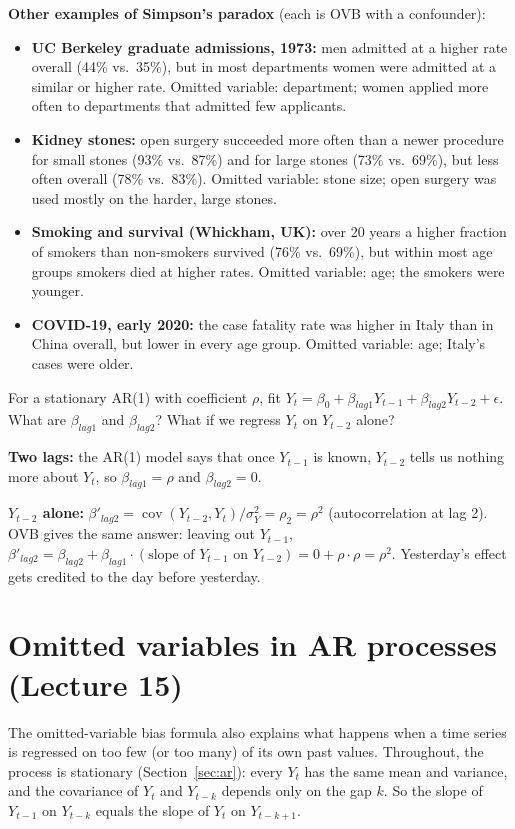 \documentclass[11pt]{article}
\newcommand{\Cov}{\operatorname{cov}}
\begin{document}
\textbf{Other examples of Simpson's paradox} (each is OVB with a confounder):
\begin{itemize}[leftmargin=*,itemsep=2pt]
\item \textbf{UC Berkeley graduate admissions, 1973:} men admitted at a higher rate overall (44\% vs.\ 35\%), but in most departments women were
admitted at a similar or higher rate. Omitted variable: department; women applied more often to departments that admitted few applicants.
\item \textbf{Kidney stones:} open surgery succeeded more often than a newer procedure for small stones (93\% vs.\ 87\%) and for large stones
(73\% vs.\ 69\%), but less often overall (78\% vs.\ 83\%). Omitted variable: stone size; open surgery was used mostly on the harder, large stones.
\item \textbf{Smoking and survival (Whickham, UK):} over 20 years a higher fraction of smokers than non-smokers survived (76\% vs.\ 69\%), but
within most age groups smokers died at higher rates. Omitted variable: age; the smokers were younger.
\item \textbf{COVID-19, early 2020:} the case fatality rate was higher in Italy than in China overall, but lower in every age group.
Omitted variable: age; Italy's cases were older.
\end{itemize}

\begin{examplebox}[title={Question (10/14): regressing an AR(1) on two lags}]
For a stationary AR(1) with coefficient $\rho$, fit $Y_t=\beta_0+\beta_{lag1}Y_{t-1}+\beta_{lag2}Y_{t-2}+\epsilon$. What are $\beta_{lag1}$ and
$\beta_{lag2}$? What if we regress $Y_t$ on $Y_{t-2}$ alone?

\textbf{Two lags:} the AR(1) model says that once $Y_{t-1}$ is known, $Y_{t-2}$ tells us nothing more about $Y_t$, so $\beta_{lag1}=\rho$ and
$\beta_{lag2}=0$.

\textbf{$Y_{t-2}$ alone:} $\beta'_{lag2}=\Cov(Y_{t-2},Y_t)/\sigma_Y^2=\rho_2=\rho^2$ (autocorrelation at lag 2). OVB gives the same answer:
leaving out $Y_{t-1}$, $\beta'_{lag2}=\beta_{lag2}+\beta_{lag1}\cdot(\text{slope of }Y_{t-1}\text{ on }Y_{t-2})=0+\rho\cdot\rho=\rho^2$.
Yesterday's effect gets credited to the day before yesterday.
\end{examplebox}

\section{Omitted variables in AR processes (Lecture 15)}\label{sec:arovb}
The omitted-variable bias formula also explains what happens when a time series is regressed on too few (or too many) of its own past
values. Throughout, the process is stationary (Section~\ref{sec:ar}): every $Y_t$ has the same mean and variance, and the covariance of
$Y_t$ and $Y_{t-k}$ depends only on the gap $k$. So the slope of $Y_{t-1}$ on $Y_{t-k}$ equals the slope of $Y_t$ on $Y_{t-k+1}$.
\end{document}
